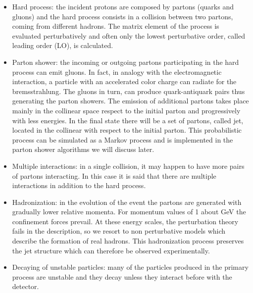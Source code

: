 \begin{itemize}

\item Hard process: the incident protons are composed by  partons (quarks and gluons) and the hard process consists in a collision between two partons, coming from different hadrons. The  matrix element of the process is evaluated perturbatively and often only the lowest perturbative order, called leading order (LO), is calculated.
\item Parton shower: the incoming or outgoing partons participating in the hard process can emit gluons. In fact, in analogy with the electromagnetic interaction, a particle with an accelerated color charge can radiate for the bremsstrahlung.
The gluons in turn, can produce quark-antiquark pairs thus generating the parton showers.
The emission of additional partons takes place mainly in the collinear space respect to the initial parton and  progressively with less energies.
In the final state there will be a set of partons, called jet, located in the collinear with respect to the initial parton.
This probabilistic process can be simulated as a Markov process and is implemented in the parton shower algorithms we will discuss later.

\item Multiple interactions: in a single collision, it may happen to have more pairs of partons interacting. In this case it is said that there are multiple interactions in addition to the hard process.

\item Hadronization: in the evolution of the event the partons are generated with gradually lower relative momenta. 
For momentum values of 1 about GeV the confinement forces prevail. At these energy scales, the perturbation theory fails in the description, so we resort to non perturbative models which describe the formation of real hadrons. This hadronization process  preserves the jet structure which can therefore be observed experimentally.

\item Decaying of unstable particles: many of the particles produced in the primary process are unstable and they  decay unless they interact before with the detector.

\end{itemize}

